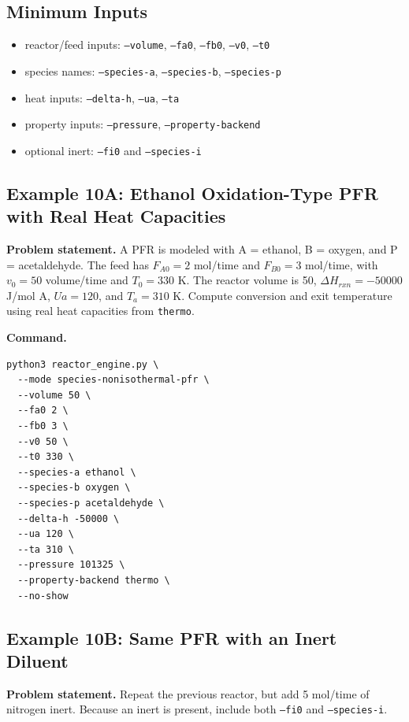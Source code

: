 \documentclass[11pt]{article}
\begin{document}
\subsection{Minimum Inputs}

\begin{itemize}
    \item reactor/feed inputs: \texttt{--volume}, \texttt{--fa0}, \texttt{--fb0}, \texttt{--v0}, \texttt{--t0}
    \item species names: \texttt{--species-a}, \texttt{--species-b}, \texttt{--species-p}
    \item heat inputs: \texttt{--delta-h}, \texttt{--ua}, \texttt{--ta}
    \item property inputs: \texttt{--pressure}, \texttt{--property-backend}
    \item optional inert: \texttt{--fi0} and \texttt{--species-i}
\end{itemize}

\subsection{Example 10A: Ethanol Oxidation-Type PFR with Real Heat Capacities}

\textbf{Problem statement.} A PFR is modeled with A = ethanol, B = oxygen, and P = acetaldehyde. The feed has $F_{A0}=2$ mol/time and $F_{B0}=3$ mol/time, with $v_0=50$ volume/time and $T_0=330$ K. The reactor volume is 50, $\Delta H_{rxn}=-50000$ J/mol A, $Ua=120$, and $T_a=310$ K. Compute conversion and exit temperature using real heat capacities from \texttt{thermo}.

\textbf{Command.}

\begin{lstlisting}
python3 reactor_engine.py \
  --mode species-nonisothermal-pfr \
  --volume 50 \
  --fa0 2 \
  --fb0 3 \
  --v0 50 \
  --t0 330 \
  --species-a ethanol \
  --species-b oxygen \
  --species-p acetaldehyde \
  --delta-h -50000 \
  --ua 120 \
  --ta 310 \
  --pressure 101325 \
  --property-backend thermo \
  --no-show
\end{lstlisting}

\subsection{Example 10B: Same PFR with an Inert Diluent}

\textbf{Problem statement.} Repeat the previous reactor, but add 5 mol/time of nitrogen inert. Because an inert is present, include both \texttt{--fi0} and \texttt{--species-i}.
\end{document}
